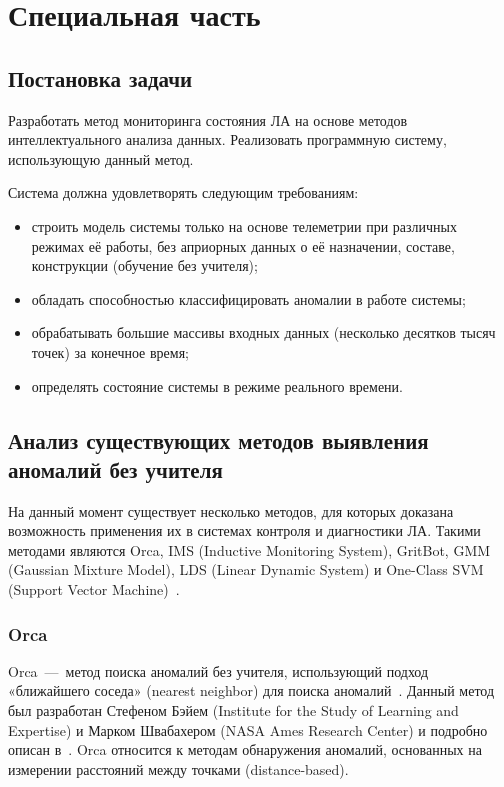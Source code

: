 \chapter{Специальная часть}
\section{Постановка задачи}
Разработать метод мониторинга состояния ЛА на основе методов интеллектуального анализа данных. Реализовать программную систему, использующую данный метод.

Система должна удовлетворять следующим требованиям:
\begin{itemize}
	\item строить модель системы только на основе телеметрии при различных режимах её работы, без априорных данных о её назначении, составе, конструкции (обучение без учителя);
	\item обладать способностью классифицировать аномалии в работе системы;
	\item обрабатывать большие массивы входных данных (несколько десятков тысяч точек) за конечное время;
	\item определять состояние системы в режиме реального времени.
\end{itemize}

\section{Анализ существующих методов выявления аномалий без учителя}
На данный момент существует несколько методов, для которых доказана возможность применения их в системах контроля и диагностики ЛА. Такими методами являются Orca, IMS (Inductive Monitoring System), GritBot, GMM (Gaussian Mixture Model), LDS (Linear Dynamic System) и One-Class SVM (Support Vector Machine)~\cite{MartinCompUnsupervisedDetectionMethods}.

\subsection{Orca}
Orca~---~метод поиска аномалий без учителя, использующий подход «ближайшего соседа» (nearest neighbor) для поиска аномалий~\cite{SchwabacherMachLearnAppl}. Данный метод был разработан Стефеном Бэйем (Institute for the Study of Learning and Expertise) и Марком Швабахером (NASA Ames Research Center) и подробно описан в~\cite{BaySchwabacherOrca}. Orca относится к методам обнаружения аномалий, основанных на измерении расстояний между точками (distance-based).


